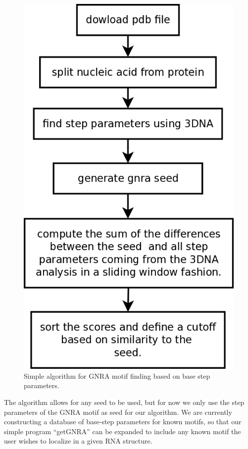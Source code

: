 \begin{figure}
\centering
\includegraphics[angle=0, scale=0.4]{Chapter5/getGNRA.png}
\caption{Simple algorithm  for GNRA motif  finding based on  base step
  parameters.}
\label{fig:getGNRA}
\end{figure}
  
The algorithm allows for any seed to  be used, but for now we only use
the step parameters  of the GNRA motif as seed  for our algorithm.  We
are  currently constructing  a  database of  base-step parameters  for
known motifs, so  that our simple program ``getGNRA''  can be expanded
to include any known motif the  user wishes to localize in a given RNA
structure.

